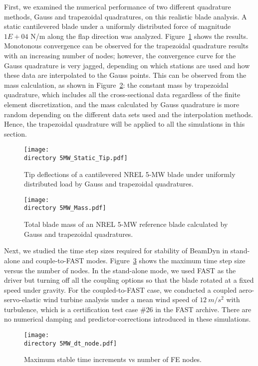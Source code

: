 \documentclass{aiaa-tc}
\def\directory{EPSF/}
\begin{document}
First, we examined the numerical performance of two different quadrature methods, Gauss and trapezoidal quadratures, on this realistic blade analysis. A static cantilevered blade under a uniformly distributed force of magnitude $1E+04$ N/m along the flap direction was analyzed. Figure~\ref{fig:5MWStaticTip} shows the results. Monotonous convergence can be observed for the trapezoidal quadrature results with an increasing number of nodes; however, the convergence curve for the Gauss quadrature is very jagged, depending on which stations are used and how these data are interpolated to the Gauss points. This can be observed from the mass calculation, as shown in Figure~\ref{fig:5MWMass}: the constant mass by trapezoidal quadrature, which includes all the cross-sectional data regardless of the finite element discretization, and the mass calculated by Gauss quadrature is more random depending on the different data sets used and the interpolation methods. Hence, the trapezoidal quadrature will be applied to all the simulations in this section.
\begin{figure}
\centering
\texttt{[image: \\directory 5MW\_Static\_Tip.pdf]}
\caption{Tip deflections of a cantilevered NREL 5-MW blade under uniformly distributed load by Gauss and trapezoidal quadratures.} 
\label{fig:5MWStaticTip}
\end{figure}

\begin{figure}
    \centering
\texttt{[image: \\directory  5MW\_Mass.pdf]}
\caption{Total blade mass of an NREL 5-MW reference blade calculated by Gauss and trapezoidal quadratures.}
\label{fig:5MWMass}
\end{figure} 

Next, we studied the time step sizes required for stability of BeamDyn in stand-alone and couple-to-FAST modes. Figure~\ref{fig:5MWdt_node} shows the maximum time step size versus the number of nodes. In the stand-alone mode, we used FAST as the driver but turning off all the coupling options so that the blade rotated at a fixed speed under gravity. For the coupled-to-FAST case, we conducted a coupled aero-servo-elastic wind turbine analysis under a mean wind speed of $12~m/s^2$ with turbulence, which is a certification test case \#26 in the FAST archive. There are no numerical damping and predictor-corrections introduced in these simulations.  

\begin{figure}
    \centering
\texttt{[image: \\directory  5MW\_dt\_node.pdf]}
\caption{Maximum stable time increments vs number of FE nodes.}
\label{fig:5MWdt_node}
\end{figure} 
\end{document}
